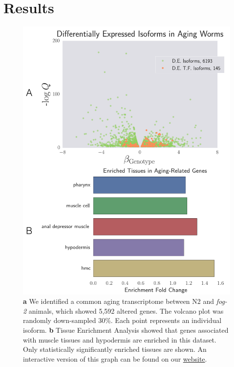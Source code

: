 \documentclass[9pt,twocolumn,twoside]{gsag3jnl}
\newcommand{\fog}{\emph{fog-2}}
\newcommand{\agen}{5,592}
\newcommand{\webref}{
\href{https://wormlabcaltech.github.io/Angeles_Leighton_2016/}{website}}
\begin{document}
\section{Results}
\label{sec:results}
\begin{figure}[htbp]
\renewcommand{\familydefault}{\sfdefault}\normalfont{}
\centering
\includegraphics[width=\linewidth]{../output/figs/final_figs/aging_transcriptomics.pdf}
\caption{\textbf{ a} We identified a common aging transcriptome between N2 and \fog{} animals, which showed \agen{}  altered genes. The volcano plot was randomly down-sampled 30\%. Each point represents an individual isoform. \textbf{b} Tissue Enrichment Analysis showed that genes associated with muscle tissues and hypodermis are enriched in this dataset. Only statistically significantly enriched tissues are shown. An interactive version of this graph can be found on our \webref{}.
}%
\label{fig:agingtranscriptome}
\end{figure}
\end{document}

